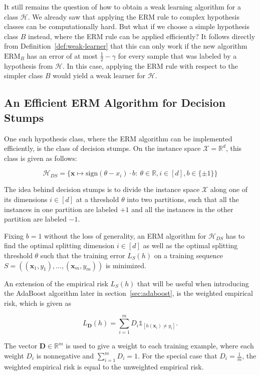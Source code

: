 It still remains the question of how to obtain a weak learning algorithm for a class $\mathcal{H}$.
We already saw that applying the ERM rule to complex hypothesis classes can be computationally hard.
But what if we choose a simple hypothesis class $B$ instead, where the ERM rule can be applied efficiently?
It follows directly from Definition~\ref{def:weak-learner} that this can only work if the new algorithm
$\text{ERM}_B$ has an error of at most $\frac{1}{2} - \gamma$ for every sample that was labeled by a hypothesis from
$\mathcal{H}$. In this case, applying the ERM rule with respect to the simpler class $B$ would yield a weak learner
for $\mathcal{H}$.

\subsection{An Efficient ERM Algorithm for Decision Stumps}

One such hypothesis class, where the ERM algorithm can be implemented efficiently, is the class of decision stumps.
On the instance space $\mathcal{X} = \mathbb{R}^d$,  this class is given as follows:
\begin{linenomath*}
    $$\mathcal{H}_{DS} = \{ \mathbf{x} \mapsto \text{sign}\left( \theta - x_i \right) \cdot b: \ 
        \theta \in \mathbb{R}, i \in \left[ d \right], b \in \{ \pm 1 \} \}$$
\end{linenomath*}

The idea behind decision stumps is to divide the instance space $\mathcal{X}$ along one of its dimensions
$i \in \left[ d \right]$ at a threshold $\theta$ into two partitions, 
such that all the instances in one partition are labeled
$+1$ and all the instances in the other partition are labeled $-1$.

Fixing $b=1$ without the loss of generality,
an ERM algorithm for $\mathcal{H}_{DS}$ has to find the optimal splitting dimension $i \in \left[ d \right]$ as well
as the optimal splitting threshold $\theta$ such that the training error $L_S(h)$ on a training sequence
$S = \left( (\mathbf{x}_1, y_1),...,(\mathbf{x}_m, y_m) \right)$ is minimized.

An extension of the empirical risk $L_S(h)$ that will be useful when introducing the AdaBoost algorithm later in
section~\ref{sec:adaboost}, is the weighted empirical risk, which is given as
\begin{linenomath*}
    $$L_\mathbf{D}(h) = \sum_{i=1}^{m} D_i \mathds{1}_{\left[ h(\mathbf{x}_i) \neq y_i \right]}.$$
\end{linenomath*}
The vector $\mathbf{D} \in \mathbb{R}^m$ is used to give a weight to each training example, where each
weight $D_i$ is nonnegative and $\sum_{i=1}^m D_i = 1$. For the special case that $D_i = \frac{1}{m}$, the
weighted empirical risk is equal to the unweighted empirical risk.

